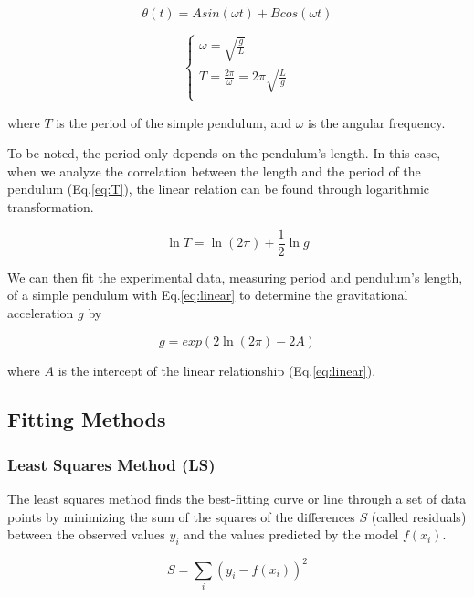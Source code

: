 \documentclass[12pt,a4paper]{article}
\begin{document}
\begin{CJK}{UTF8}{bkai}
\begin{equation}
    \theta(t) = Asin(\omega t)+Bcos(\omega t)
\end{equation}

\begin{equation}
\begin{cases}\label{eq:T}
    \omega=\sqrt{\frac{g}{L}} \\
    T=\frac{2\pi}{\omega}=2\pi\sqrt{\frac{L}{g}}\\
\end{cases}
\end{equation}

where $T$ is the period of the simple pendulum, and $\omega$ is the angular frequency.

To be noted, the period only depends on the pendulum's length. In this case, when we analyze the correlation between the length and the period of the pendulum (Eq.\ref{eq:T}), the linear relation can be found through logarithmic transformation.

\begin{equation}\label{eq:linear}
    \ln T=\ln(2\pi)+\frac{1}{2}\ln g
\end{equation}

We can then fit the experimental data, measuring period and pendulum's length, of a simple pendulum with Eq.\ref{eq:linear} to determine the gravitational acceleration $g$ by

\begin{equation}
    g=exp\left(2\ln(2\pi)-2A\right)
\end{equation}

where $A$ is the intercept of the linear relationship (Eq.\ref{eq:linear}).


\subsection{Fitting Methods}
\subsubsection{Least Squares Method (LS)}
\hfill

The least squares method finds the best-fitting curve or line through a set of data points by minimizing the sum of the squares of the differences $S$ (called residuals) between the observed values $y_i$ and the values predicted by the model $f(x_i)$.

\begin{equation}
    S=\sum_{i}(y_i-f(x_i))^2
\end{equation}



\end{CJK}
\end{document}
